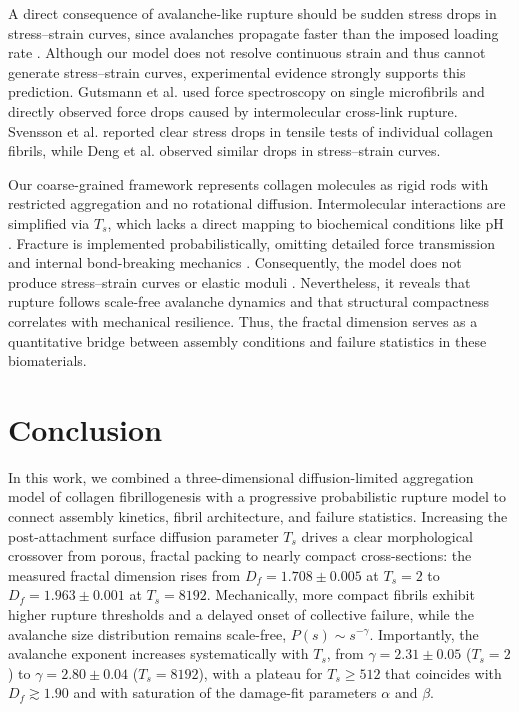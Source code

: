 \documentclass[aps,physrev,preprint,groupedaddress,linenumbers]{revtex4-2}
\begin{document}
A direct consequence of avalanche-like rupture should be sudden stress drops in stress--strain curves, since avalanches propagate faster than the imposed loading rate \cite{Noguchi2024}. Although our model does not resolve continuous strain and thus cannot generate stress--strain curves, experimental evidence strongly supports this prediction. Gutsmann et al. \cite{Gutsmann2004} used force spectroscopy on single microfibrils and directly observed force drops caused by intermolecular cross-link rupture. Svensson et al. \cite{Svensson2013} reported clear stress drops in tensile tests of individual collagen fibrils, while Deng et al. \cite{Deng2024} observed similar drops in stress--strain curves.

Our coarse-grained framework represents collagen molecules as rigid rods with restricted aggregation and no rotational diffusion. Intermolecular interactions are simplified via $T_s$, which lacks a direct mapping to biochemical conditions like pH \cite{Jiang2004}. Fracture is implemented probabilistically, omitting detailed force transmission and internal bond-breaking mechanics \cite{RuizFranco2022,Provenzano2006}. Consequently, the model does not produce stress--strain curves or elastic moduli \cite{Innocenti2022-lp}. Nevertheless, it reveals that rupture follows scale-free avalanche dynamics and that structural compactness correlates with mechanical resilience. Thus, the fractal dimension serves as a quantitative bridge between assembly conditions and failure statistics in these biomaterials.

\section{Conclusion}

In this work, we combined a three-dimensional diffusion-limited aggregation model of collagen fibrillogenesis with a progressive probabilistic rupture model to connect assembly kinetics, fibril architecture, and failure statistics. Increasing the post-attachment surface diffusion parameter $T_s$ drives a clear morphological crossover from porous, fractal packing to nearly compact cross-sections: the measured fractal dimension rises from $D_f=1.708\pm0.005$ at $T_s=2$ to $D_f=1.963\pm0.001$ at $T_s=8192$. Mechanically, more compact fibrils exhibit higher rupture thresholds and a delayed onset of collective failure, while the avalanche size distribution remains scale-free, $P(s)\sim s^{-\gamma}$. Importantly, the avalanche exponent increases systematically with $T_s$, from $\gamma=2.31\pm0.05$ ($T_s=2$) to $\gamma=2.80\pm0.04$ ($T_s=8192$), with a plateau for $T_s\ge 512$ that coincides with $D_f\gtrsim 1.90$ and with saturation of the damage-fit parameters $\alpha$ and $\beta$.
\end{document}
